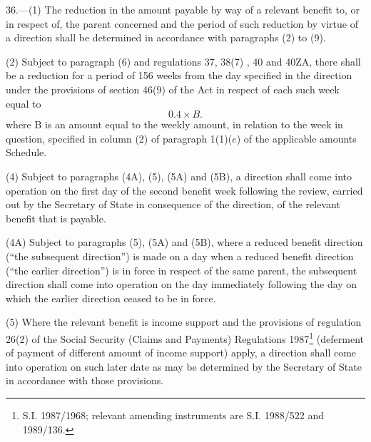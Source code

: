 \documentclass[a4paper,12pt]{article}
\begin{document}
36.—(1) The reduction in the amount payable by way of a relevant benefit to, or in respect of, the parent concerned and the period of such reduction by virtue of a direction shall be determined in accordance with paragraphs (2) to (9).

(2) Subject to paragraph (6) and regulations 37, 38(7)%
, 40 and 40ZA,  %
there shall be a reduction for a period of 
156 weeks  %
from the day specified in the direction under the provisions of section 46(9) of the Act in respect of each such week equal to
\[0.4 \times B.\]  %
where B is an amount equal to the weekly amount, in relation to the week in question, specified in column (2) of paragraph 1(1)($e$) of the applicable amounts Schedule.



(4) 
Subject to paragraphs 
(4A),  %
(5), (5A) and (5B),  %
a direction shall come into operation on the first day of the second benefit week following the review, carried out by 
the Secretary of State  %
in consequence of the direction, of the relevant benefit that is payable.

(4A) Subject to paragraphs (5), (5A) and (5B), where a reduced benefit direction (“the subsequent direction”) is made on a day when a reduced benefit direction (“the earlier direction”) is in force in respect of the same parent, the subsequent direction shall come into operation on the day immediately following the day on which the earlier direction ceased to be in force.

(5) Where the relevant benefit is income support and the provisions of regulation 26(2) of the Social Security (Claims and Payments) Regulations 1987\footnote{\frenchspacing S.I. 1987/1968; relevant amending instruments are S.I. 1988/522 and 1989/136.} (deferment of payment of different amount of income support) apply, a direction shall come into operation on such later date as may be determined by the Secretary of State in accordance with those provisions.
\end{document}
